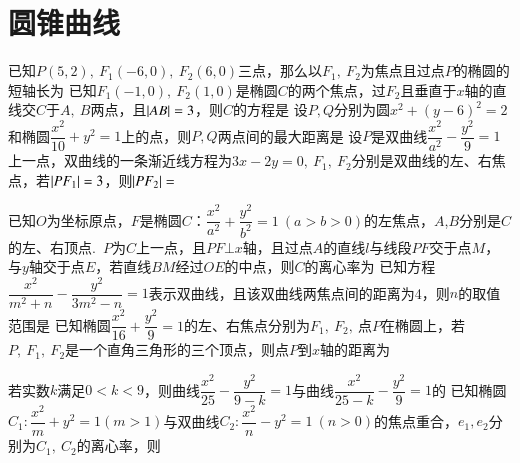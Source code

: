 \documentclass{BHCexam}
\begin{document}
\fubiaoti{}
\maketitle

\section{圆锥曲线}

\begin{questions}
\qs 已知$ P(5,2) ,\ F_1(-6,0),\ F_2(6,0)$三点，那么以$ F_1,\ F_2 $为焦点且过点$ P $的椭圆的短轴长为\xx
{}
\qs 已知$ F_1(-1,0) ,\ F_2(1,0)$是椭圆$ C $的两个焦点，过$ F_2 $且垂直于$x$轴的直线交$ C $于$ A,\ B $两点，且$ \left| AB \right|=3 $，则$ C $的方程是\xx
{}
\qs 设$ P,Q $分别为圆$ x^2+\left(y-6\right)^2 =2$和椭圆$ \dfrac{x^2}{10} +y^2=1$上的点，则$ P,Q $两点间的最大距离是\xx
{}
\qs 设$ P $是双曲线$\dfrac{x^2}{a^2}-\dfrac{y^2}{9}=1$上一点，双曲线的一条渐近线方程为$ 3x-2y=0 ,~F_1,~F_2$分别是双曲线的左、右焦点，若$ \left| PF_1 \right|=3 $，则$ \left| PF_2 \right| =$\xx
{}


\question
已知$O$为坐标原点，$F$是椭圆$C$：$\dfrac{x^2}{a^2}+\dfrac{y^2}{b^2}=1~(a>b>0)$的左焦点，$A$,$B$分别是$C$的左、右顶点.~$P$为$C$上一点，且$PF\bm{\bot} x$轴，且过点$A$的直线$l$与线段$PF$交于点$M$，与$y$轴交于点$E$，若直线$BM$经过$OE$的中点，则$C$的离心率为\xx 
{}
\question
已知方程$\dfrac{x^2}{m^2+n}-\dfrac{y^2}{3m^2-n}=1$表示双曲线，且该双曲线两焦点间的距离为4，则$n$的取值范围是\xx
{}
\qs 已知椭圆$ \dfrac{x^2}{16} +\dfrac{y^2}{9}=1$的左、右焦点分别为$ F_1,\ F_2 ,~$点$ P $在椭圆上，若$ P,\ F_1,\ F_2 $是一个直角三角形的三个顶点，则点$P $到$x$轴的距离为\xx
{}

\qs 若实数$ k $满足$ 0<k<9 $，则曲线$ \dfrac{x^2}{25}-\dfrac{y^2}{9-k} =1$与曲线$ \dfrac{x^2}{25-k} -\dfrac{y^2}{9}=1$的\xx
{}
\qs 已知椭圆$C_1:\dfrac{x^2}{m}+y^2=1(m>1)$与双曲线$ C_2:\dfrac{x^2}{n}-y^2=1~(n>0) $的焦点重合，$ e_1,e_2 $分别为$ C_1,\ C_2 $的离心率，则\xx
{}



\end{questions}
\end{document}
